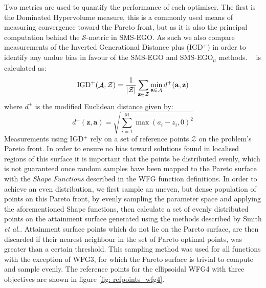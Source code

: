 \documentclass[conference]{IEEEtran}
\makeatletter
\DeclarePairedDelimiter\abs{\lvert}{\rvert}%
\DeclareMathOperator*{\attainmentfront}{\mathcal{A}}
\DeclareMathOperator*{\nobj}{M}
\DeclareMathOperator*{\igdp}{IGD^{+}}
\newcommand\hpv{Dominated Hypervolume\xspace}
\newcommand\smsego{SMS-EGO\xspace}
\newcommand\smsegomu{SMS-EGO$_{\mu}$\xspace}
\newcommand\igd{IGD$^+$\xspace}
\newcommand{\pigdref}{\mathcal{Z}}
\newcommand*{\etal}{\textit{et al.}\@\xspace}
\makeatother
\begin{document}
Two metrics are used to quantify the performance of each optimiser. The first is the \hpv measure, this is a commonly used means of measuring convergence toward the Pareto front, but as it is also the principal computation behind the $\mathcal{S}$-metric in \smsego. As such we also compare measurements of the Inverted Generational Distance plus (\igd) \cite{ishibuchi2015modified} in order to identify any undue bias in favour of the \smsego and \smsegomu methods. $\igdp$ is calculated as:
\begin{equation}
    \igdp(\attainmentfront, \pigdref) = \frac{1}{\abs{\pigdref}}
    \sum_{\mathbf{z}\in\pigdref} \min_{\mathbf{a}\in \attainmentfront} d^{+}(\mathbf{a}, \mathbf{z})
\end{equation}
where $d^{+}$ is the modified Euclidean distance given by:
\begin{equation}
    d^+(\mathbf{z}, \mathbf{a}) = \sqrt{\sum^{\nobj}_{i=1}\max(a_i - z_i, 0)^2}
\end{equation}
Measurements using \igd rely on a set of reference points $\pigdref$ on the problem's Pareto front. In order to ensure no bias toward solutions found in localised regions of this surface it is important that the points be distributed evenly, which is not guaranteed once random samples have been mapped to the Pareto surface with the \textit{Shape Functions} described in the WFG function definitions. In order to achieve an even distribution, we first sample an uneven, but dense population of points on this Pareto front, by evenly sampling the parameter space and applying the aforementioned Shape functions, then calculate a set of evenly distributed points on the attainment surface generated using the methods described by Smith \etal \cite{smith2004dominance}. Attainment surface points which do not lie on the Pareto surface, are then discarded if their nearest neighbour in the set of Pareto optimal points, was greater than a certain threshold. This sampling method was used for all functions with the exception of WFG3, for which the Pareto surface is trivial to compute and sample evenly. The reference points for the ellipsoidal WFG4 with three objectives are shown in figure \ref{fig: refpoints_wfg4}.  
\end{document}
